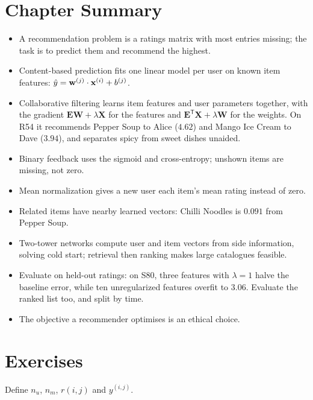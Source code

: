 \section*{Chapter Summary}

\begin{itemize}
  \item A recommendation problem is a ratings matrix with most entries missing; the
        task is to predict them and recommend the highest.
  \item Content-based prediction fits one linear model per user on known item
        features: $\hat y = \mathbf{w}^{(j)}\cdot\mathbf{x}^{(i)} + b^{(j)}$.
  \item Collaborative filtering learns item features and user parameters together,
        with the gradient $\mathbf{E}\mathbf{W} + \lambda\mathbf{X}$ for the
        features and $\mathbf{E}^{\mathsf T}\mathbf{X} + \lambda\mathbf{W}$ for the
        weights. On R54 it recommends Pepper Soup to Alice ($4.62$) and Mango Ice
        Cream to Dave ($3.94$), and separates spicy from sweet dishes unaided.
  \item Binary feedback uses the sigmoid and cross-entropy; unshown items are
        missing, not zero.
  \item Mean normalization gives a new user each item's mean rating instead of
        zero.
  \item Related items have nearby learned vectors: Chilli Noodles is $0.091$ from
        Pepper Soup.
  \item Two-tower networks compute user and item vectors from side information,
        solving cold start; retrieval then ranking makes large catalogues feasible.
  \item Evaluate on held-out ratings: on S80, three features with $\lambda = 1$
        halve the baseline error, while ten unregularized features overfit to
        $3.06$. Evaluate the ranked list too, and split by time.
  \item The objective a recommender optimises is an ethical choice.
\end{itemize}

\section*{Exercises}


\sq Define $n_u$, $n_m$, $r(i,j)$ and $y^{(i,j)}$.

